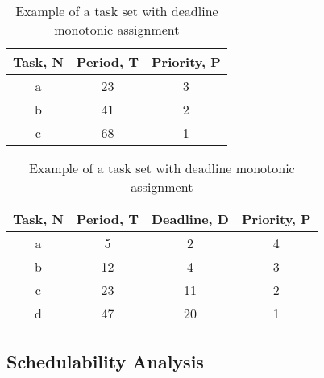 \begin{table}[ht]
\begin{minipage}[b]{0.45\linewidth}
\caption{Example of a task set with rate monotonic assignment}
\centering
\begin{tabular}{c c c}
\hline\hline
Task, N & Period, T & Priority, P \\ [0.5ex]
\hline 
a & 23 & 3 \\
b & 41 & 2 \\
c & 68 & 1 \\ [1ex]
\hline
\end{tabular}
\end{minipage}
\hspace{0.5cm}
\begin{minipage}[b]{0.45\linewidth}
\caption{Example of a task set with deadline monotonic assignment}
\centering
\begin{tabular}{c c c c}
\hline\hline
Task, N & Period, T & Deadline, D & Priority, P \\ [0.5ex]
\hline 
a & 5  & 2 & 4 \\
b & 12 & 4 & 3 \\
c & 23 & 11 & 2  \\
d & 47 & 20 & 1  \\ [1ex]
\hline
\end{tabular}
\end{minipage}
\end{table}


\subsection{Schedulability Analysis} %


\label{sec:schedulability_analysis}


